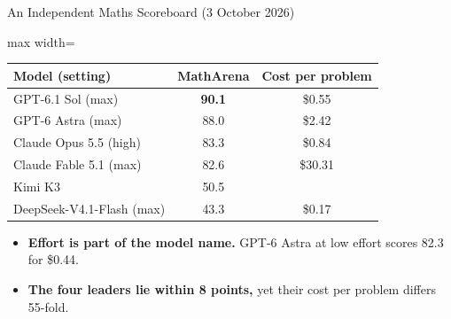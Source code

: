 \begin{frame}{An Independent Maths Scoreboard (3 October 2026)}
    \begin{center}
    \small
    \renewcommand{\arraystretch}{1.1}
    \begin{adjustbox}{max width=\linewidth}\begin{tabular}{lcc}
        \toprule
        \textbf{Model (setting)} & \textbf{MathArena} & \textbf{Cost per problem} \\
        \midrule
        GPT-6.1 Sol (max) & \textbf{90.1} & \$0.55 \\
        GPT-6 Astra (max) & 88.0 & \$2.42 \\
        Claude Opus 5.5 (high) & 83.3 & \$0.84 \\
        Claude Fable 5.1 (max) & 82.6 & \$30.31 \\
        Kimi K3 & 50.5 & \\
        DeepSeek-V4.1-Flash (max) & 43.3 & \$0.17 \\
        \bottomrule
    \end{tabular}\end{adjustbox}
    \end{center}
    \begin{itemize}\itemsep0.35em
        \item \textbf{Effort is part of the model name.} GPT-6 Astra at low effort scores 82.3 for \$0.44.
        \item \textbf{The four leaders lie within 8 points,} yet their cost per problem differs 55-fold.
    \end{itemize}
    \vspace{0.05em}
\end{frame}

